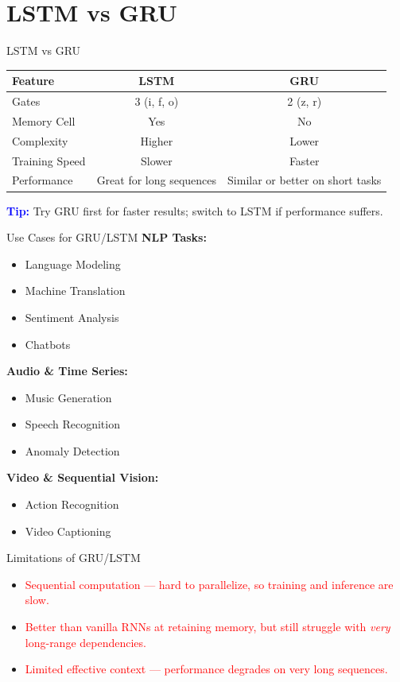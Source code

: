 \section{LSTM vs GRU}
\begin{frame}{LSTM vs GRU}
  \small
  \begin{table}[h]
    \centering
    \begin{tabular}{|l|c|c|}
      \hline
      \textbf{Feature} & \textbf{LSTM} & \textbf{GRU} \\
      \hline
      Gates & 3 (i, f, o) & 2 (z, r) \\
      Memory Cell & Yes & No \\
      Complexity & Higher & Lower \\
      Training Speed & Slower & Faster \\
      Performance & Great for long sequences & Similar or better on short tasks \\
      \hline
    \end{tabular}
  \end{table}
  \vspace{1em}
  \textbf{\textcolor{blue}{Tip:}} Try GRU first for faster results; switch to LSTM if performance suffers.
\end{frame}

\begin{frame}{Use Cases for GRU/LSTM}
  \small
  \textbf{NLP Tasks:}
  \begin{itemize}
    \item Language Modeling
    \item Machine Translation
    \item Sentiment Analysis
    \item Chatbots
  \end{itemize}
  \textbf{Audio \& Time Series:}
  \begin{itemize}
    \item Music Generation
    \item Speech Recognition
    \item Anomaly Detection
  \end{itemize}
  \textbf{Video \& Sequential Vision:}
  \begin{itemize}
    \item Action Recognition
    \item Video Captioning
  \end{itemize}
\end{frame}

\begin{frame}{Limitations of GRU/LSTM}
  \small
  \begin{itemize}
    \item \textcolor{red}{Sequential computation --- hard to parallelize, so training and inference are slow.}
    \item \textcolor{red}{Better than vanilla RNNs at retaining memory, but still struggle with \emph{very} long-range dependencies.}
    \item \textcolor{red}{Limited effective context --- performance degrades on very long sequences.}
  \end{itemize}
\end{frame}

